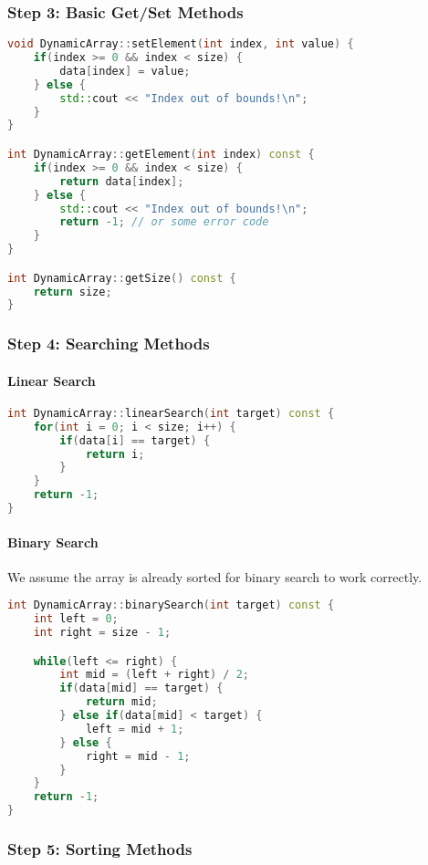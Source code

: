 \documentclass[a4paper,12pt]{article}
\begin{document}
\subsubsection*{Step 3: Basic Get/Set Methods}
\begin{lstlisting}[language=C++]
void DynamicArray::setElement(int index, int value) {
    if(index >= 0 && index < size) {
        data[index] = value;
    } else {
        std::cout << "Index out of bounds!\n";
    }
}

int DynamicArray::getElement(int index) const {
    if(index >= 0 && index < size) {
        return data[index];
    } else {
        std::cout << "Index out of bounds!\n";
        return -1; // or some error code
    }
}

int DynamicArray::getSize() const {
    return size;
}
\end{lstlisting}

\subsubsection*{Step 4: Searching Methods}
\paragraph{Linear Search}
\begin{lstlisting}[language=C++]
int DynamicArray::linearSearch(int target) const {
    for(int i = 0; i < size; i++) {
        if(data[i] == target) {
            return i;
        }
    }
    return -1;
}
\end{lstlisting}

\paragraph{Binary Search}
We assume the array is already sorted for binary search to work correctly.
\begin{lstlisting}[language=C++]
int DynamicArray::binarySearch(int target) const {
    int left = 0;
    int right = size - 1;

    while(left <= right) {
        int mid = (left + right) / 2;
        if(data[mid] == target) {
            return mid;
        } else if(data[mid] < target) {
            left = mid + 1;
        } else {
            right = mid - 1;
        }
    }
    return -1;
}
\end{lstlisting}

\subsubsection*{Step 5: Sorting Methods}
\end{document}

